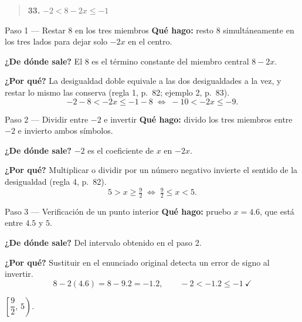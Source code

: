 \documentclass[11pt]{article}
\begin{document}
\begin{quote}
\textbf{33.} $-2<8-2x\le -1$
\end{quote}

\begin{paso}{Paso 1 --- Restar $8$ en los tres miembros}
\textbf{Qué hago:} resto $8$ simultáneamente en los tres lados para dejar solo $-2x$ en el centro.

\textbf{¿De dónde sale?} El $8$ es el término constante del miembro central $8-2x$.

\textbf{¿Por qué?} La desigualdad doble equivale a las dos desigualdades a la vez, y restar lo mismo las conserva (regla 1, p.~82; ejemplo 2, p.~83).
\[
-2-8<-2x\le -1-8 \;\Longleftrightarrow\; -10<-2x\le -9.
\]
\end{paso}

\begin{paso}{Paso 2 --- Dividir entre $-2$ e invertir}
\textbf{Qué hago:} divido los tres miembros entre $-2$ e invierto ambos símbolos.

\textbf{¿De dónde sale?} $-2$ es el coeficiente de $x$ en $-2x$.

\textbf{¿Por qué?} Multiplicar o dividir por un número negativo invierte el sentido de la desigualdad (regla 4, p.~82).
\[
5>x\ge \tfrac92 \;\Longleftrightarrow\; \tfrac92\le x<5.
\]
\end{paso}

\begin{paso}{Paso 3 --- Verificación de un punto interior}
\textbf{Qué hago:} pruebo $x=4.6$, que está entre $4.5$ y $5$.

\textbf{¿De dónde sale?} Del intervalo obtenido en el paso 2.

\textbf{¿Por qué?} Sustituir en el enunciado original detecta un error de signo al invertir.
\[
8-2(4.6)=8-9.2=-1.2, \qquad -2<-1.2\le -1 \ \checkmark
\]
\end{paso}

\begin{center}
\end{center}

\begin{resp}
$\left[\dfrac92,\,5\right)$.
\end{resp}
\end{document}
